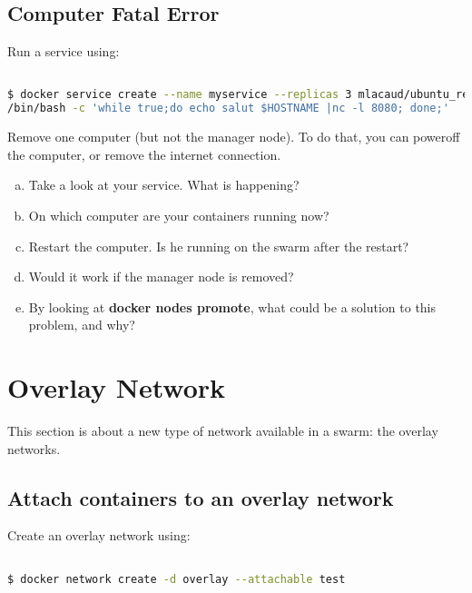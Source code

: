 \documentclass[a4paper,11pt]{exam}
\begin{document}
\subsection{Computer Fatal Error}
Run a service using:
\begin{lstlisting}[frame=single,language={sh}]  % Start your code-block

$ docker service create --name myservice --replicas 3 mlacaud/ubuntu_re355 \
/bin/bash -c 'while true;do echo salut $HOSTNAME |nc -l 8080; done;'

\end{lstlisting}
\begin{questions}
	\question Remove one computer (but not the manager node). To do that, you can poweroff the computer, or remove the internet connection.
	\begin{enumerate}[(a)]
		\item Take a look at your service. What is happening?
		\item On which computer are your containers running now?
		\item Restart the computer. Is he running on the swarm after the restart?
		\item Would it work if the manager node is removed?
		\item By looking at \textbf{docker nodes promote}, what could be a solution to this problem, and why?
	\end{enumerate}
\end{questions}
 
\section{Overlay Network} 
This section is about a new type of network available in a swarm: the overlay networks. 
\subsection{Attach containers to an overlay network}
Create an overlay network using:

\begin{lstlisting}[frame=single,language={sh}]  % Start your code-block

$ docker network create -d overlay --attachable test 
\end{lstlisting}
\end{document}

